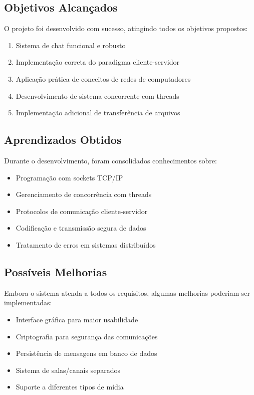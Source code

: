 \documentclass[12pt,a4paper]{article}
\begin{document}
\subsection{Objetivos Alcançados}

O projeto foi desenvolvido com sucesso, atingindo todos os objetivos propostos:

\begin{enumerate}
    \item Sistema de chat funcional e robusto
    \item Implementação correta do paradigma cliente-servidor
    \item Aplicação prática de conceitos de redes de computadores
    \item Desenvolvimento de sistema concorrente com threads
    \item Implementação adicional de transferência de arquivos
\end{enumerate}

\subsection{Aprendizados Obtidos}

Durante o desenvolvimento, foram consolidados conhecimentos sobre:

\begin{itemize}
    \item Programação com sockets TCP/IP
    \item Gerenciamento de concorrência com threads
    \item Protocolos de comunicação cliente-servidor
    \item Codificação e transmissão segura de dados
    \item Tratamento de erros em sistemas distribuídos
\end{itemize}

\subsection{Possíveis Melhorias}

Embora o sistema atenda a todos os requisitos, algumas melhorias poderiam ser implementadas:

\begin{itemize}
    \item Interface gráfica para maior usabilidade
    \item Criptografia para segurança das comunicações
    \item Persistência de mensagens em banco de dados
    \item Sistema de salas/canais separados
    \item Suporte a diferentes tipos de mídia
\end{itemize}
\end{document}
